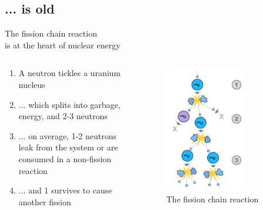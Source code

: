 \documentclass{beamer}
\begin{document}
    \subsection{... is old}

        \begin{frame}{The fission chain reaction \\ is at the heart of nuclear energy}

            \begin{columns}[T]

                \begin{column}{0.5\textwidth}
                    \begin{enumerate}
                        \item A neutron tickles a uranium nucleus
                        \pause
                        \item ... which splits into garbage, energy, and 2-3 neutrons
                        \pause
                        \item ... on average, 1-2 neutrons leak from the system or are consumed in a non-fission reaction
                        \pause
                        \item ... and 1 survives to cause another fission
                    \end{enumerate}
                \end{column}

                \begin{column}{0.5\textwidth}
                    \begin{figure}
                        \centering
                        \includegraphics[width=0.7\textwidth]{./img/chainReaction.pdf}
                        \caption*{The fission chain reaction}
                    \end{figure}
                \end{column}


\end{columns}
\end{frame}
\end{document}

